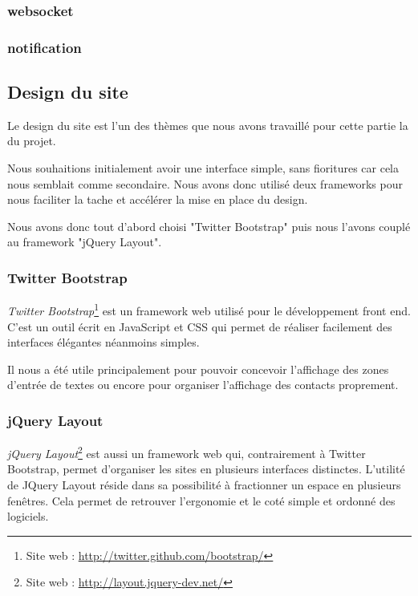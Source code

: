 \subsubsection{websocket}

\subsubsection{notification}



\subsection{Design du site}

Le design du site est l'un des thèmes que nous avons travaillé pour cette partie la du projet.

Nous souhaitions initialement avoir une interface simple, sans fioritures car cela nous semblait comme
secondaire. Nous avons donc utilisé deux frameworks pour nous faciliter la tache et accélérer la mise
en place du design.

Nous avons donc tout d'abord choisi "Twitter Bootstrap" puis nous l'avons couplé au framework "jQuery
Layout".
\\


\subsubsection{Twitter Bootstrap}

\textit{Twitter Bootstrap}\footnote{Site web : \href{http://twitter.github.com/bootstrap/}{http://twitter.github.com/bootstrap/}} est un framework web utilisé pour le développement front end.
C'est un outil écrit en JavaScript et CSS qui permet de réaliser facilement des interfaces élégantes néanmoins simples. 

Il nous a été utile principalement pour pouvoir concevoir l'affichage des zones d'entrée de textes ou 
encore pour organiser l'affichage des contacts proprement.
\\


\subsubsection{jQuery Layout}

\textit{jQuery Layout}\footnote{Site web : \href{http://layout.jquery-dev.net/}{http://layout.jquery-dev.net/}} est aussi un framework web qui, contrairement à Twitter Bootstrap, permet d'organiser les sites en plusieurs interfaces distinctes. 
L'utilité de JQuery Layout réside dans sa possibilité à fractionner un espace en plusieurs fenêtres.
Cela permet de retrouver l'ergonomie et le coté simple et ordonné des logiciels. 

